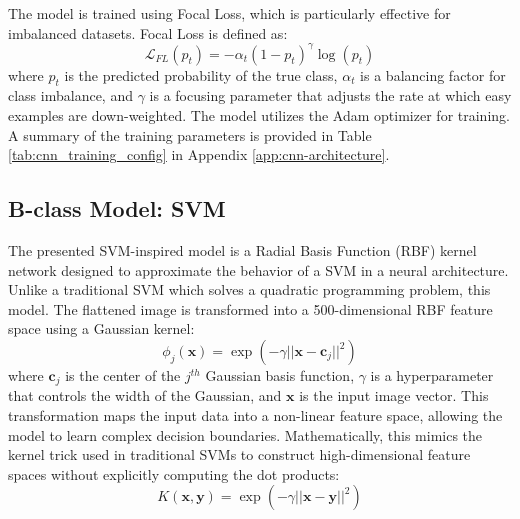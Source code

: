 \documentclass[conference]{IEEEtran}
\begin{document}
The model is trained using Focal Loss, which is particularly effective for imbalanced datasets.
Focal Loss is defined as:
\begin{equation}
    \mathcal{L}_{FL}(p_t) = -\alpha_t (1 - p_t)^\gamma \log(p_t)
\end{equation}
where \(p_t\) is the predicted probability of the true class, \(\alpha_t\) is a balancing factor for class imbalance, and \(\gamma\) is a focusing parameter that adjusts the rate at which easy examples are down-weighted.
The model utilizes the Adam optimizer for training. 
A summary of the training parameters is provided in Table \ref{tab:cnn_training_config} in Appendix \ref{app:cnn-architecture}.

\subsection{B-class Model: SVM}
The presented SVM-inspired model is a Radial Basis Function (RBF) kernel network designed to approximate the behavior of a SVM in a neural architecture. 
Unlike a traditional SVM which solves a quadratic programming problem, this model.
The flattened image is transformed into a 500-dimensional RBF feature space using a Gaussian kernel:
\begin{equation}
    \phi_j(\bm{x}) = \exp\left( -\gamma || \bm{x} - \bm{c}_j ||^2 \right)
\end{equation}
where \(\bm{c}_j\) is the center of the \(j^{th}\) Gaussian basis function, \(\gamma\) is a hyperparameter that controls the width of the Gaussian, and \(\bm{x}\) is the input image vector.
This transformation maps the input data into a non-linear feature space, allowing the model to learn complex decision boundaries.
Mathematically, this mimics the kernel trick used in traditional SVMs to construct high-dimensional feature spaces without explicitly computing the dot products:
\begin{equation*}
    K(\bm{x}, \bm{y}) = \exp\left( -\gamma || \bm{x} - \bm{y} ||^2 \right)
\end{equation*}
\end{document}
